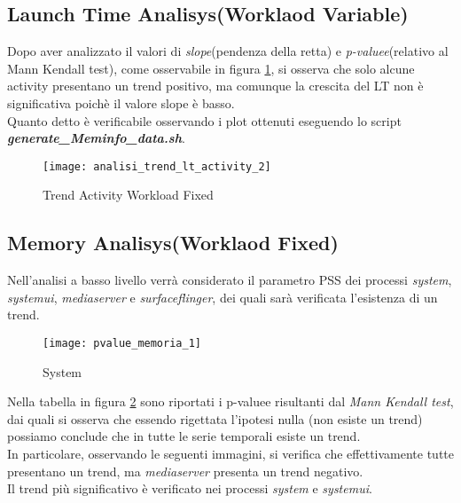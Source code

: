 \clearpage

\subsection{Launch Time Analisys(Worklaod Variable)}
Dopo aver analizzato il valori di \textit{slope}(pendenza della retta) e
\textit{p-valuee}(relativo al Mann Kendall test), come osservabile in figura \ref{analisi_trend_lt_activity_2},
si osserva che solo alcune activity presentano un trend positivo, ma comunque la crescita del LT non è
significativa poichè il valore slope è basso.\\
Quanto detto è verificabile osservando i plot ottenuti eseguendo lo script  \textit{\textbf{generate\_Meminfo\_data.sh}}.

\begin{figure}[!htbp]
  \centering
  \texttt{[image: analisi\_trend\_lt\_activity\_2]}
  \caption{Trend Activity Workload Fixed}
  \label{analisi_trend_lt_activity_2}
\end{figure}

\clearpage

\subsection{Memory Analisys(Worklaod Fixed)}

Nell'analisi a basso livello verrà considerato il parametro PSS dei processi \textit{system},
\textit{systemui}, \textit{mediaserver} e \textit{surfaceflinger}, dei quali
sarà verificata l'esistenza di un trend.\\

\begin{figure}[!htbp]
  \centering
  \texttt{[image: pvalue\_memoria\_1]}
  \caption{System}
  \label{pvalue_memoria_1}
\end{figure}

Nella tabella in figura \ref{pvalue_memoria_1} sono riportati i p-valuee risultanti
dal \textit{Mann Kendall test}, dai quali si osserva che essendo rigettata l'ipotesi
nulla (non esiste un trend) possiamo conclude che in tutte le serie temporali
esiste un trend.\\
In particolare, osservando le seguenti immagini, si verifica che effettivamente
tutte presentano un trend, ma \textit{mediaserver} presenta un trend negativo.\\
Il trend più significativo è verificato nei processi \textit{system} e \textit{systemui}.

